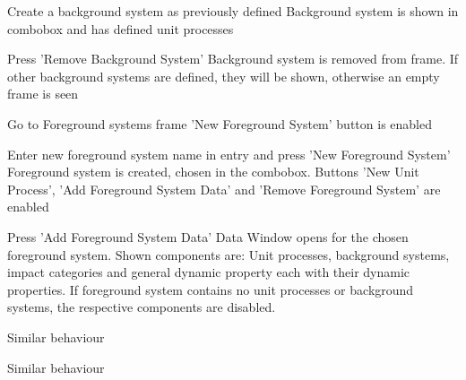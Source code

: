 {
\step
{Create a background system as previously defined}
{Background system is shown in combobox and has defined unit processes}

\step
{Press 'Remove Background System'}
{Background system is removed from frame. If other background systems are defined, they will be shown, otherwise an empty frame is seen}
}




{
\step
{Go to Foreground systems frame}
{'New Foreground System' button is enabled}

\step
{Enter new foreground system name in entry and press 'New Foreground System'}
{Foreground system is created, chosen in the combobox. Buttons 'New Unit Process', 'Add Foreground System Data' and 'Remove Foreground System'  are enabled}

\placeholder

\step
{Press 'Add Foreground System Data'}
{
Data Window opens for the chosen foreground system. 
Shown components are: Unit processes, background systems, impact categories and general dynamic property each with their dynamic properties. If foreground system contains no unit processes or background systems, the respective components are disabled.}
}





{
{Similar behaviour}
}




{
{Similar behaviour}
}


